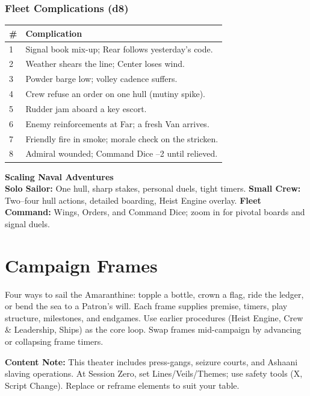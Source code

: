 \documentclass[11pt,oneside]{book}
\begin{document}
\begin{itemize}
\subsection*{Fleet Complications (d8)}
\begin{tabularx}{\linewidth}{@{}p{0.7cm} X@{}}
\toprule
\# & \textbf{Complication}\\
\midrule
1 & Signal book mix-up; Rear follows yesterday's code.\\
2 & Weather shears the line; Center loses wind.\\
3 & Powder barge low; volley cadence suffers.\\
4 & Crew refuse an order on one hull (mutiny spike).\\
5 & Rudder jam aboard a key escort.\\
6 & Enemy reinforcements at Far; a fresh Van arrives.\\
7 & Friendly fire in smoke; morale check on the stricken.\\
8 & Admiral wounded; Command Dice --2 until relieved.\\
\bottomrule
\end{tabularx}

\begin{tcolorbox}[breakable]
\textbf{Scaling Naval Adventures}\\
\textbf{Solo Sailor:} One hull, sharp stakes, personal duels, tight timers. \quad
\textbf{Small Crew:} Two--four hull actions, detailed boarding, Heist Engine overlay. \quad
\textbf{Fleet Command:} Wings, Orders, and Command Dice; zoom in for pivotal boards and signal duels.
\end{tcolorbox}

\chapter{Campaign Frames}

\noindent Four ways to sail the Amaranthine: topple a bottle, crown a flag, ride the ledger, or bend the sea to a Patron's will. Each frame supplies premise, timers, play structure, milestones, and endgames. Use earlier procedures (Heist Engine, Crew \& Leadership, Ships) as the core loop. Swap frames mid-campaign by advancing or collapsing frame timers.

\begin{tcolorbox}[breakable]
\textbf{Content Note:} This theater includes press-gangs, seizure courts, and Ashaani slaving operations. At Session Zero, set Lines/Veils/Themes; use safety tools (X, Script Change). Replace or reframe elements to suit your table.
\end{tcolorbox}


\end{itemize}
\end{document}
